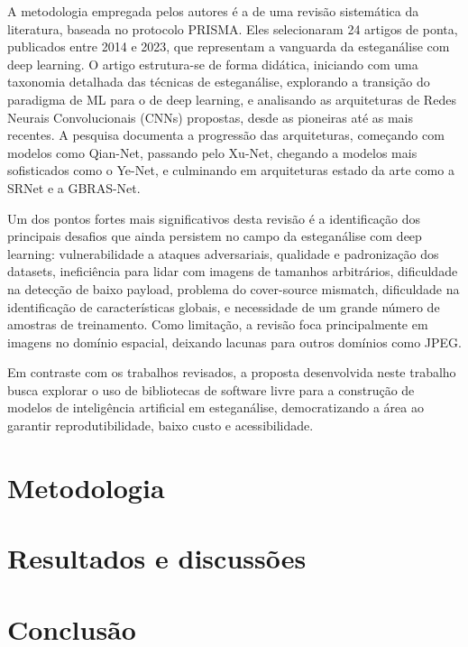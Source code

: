 \documentclass[12pt]{article}
\begin{document}
A metodologia empregada pelos autores é a de uma revisão sistemática da
literatura, baseada no protocolo PRISMA. Eles selecionaram 24 artigos de ponta,
publicados entre 2014 e 2023, que representam a vanguarda da esteganálise com
deep learning. O artigo estrutura-se de forma didática, iniciando com uma
taxonomia detalhada das técnicas de esteganálise, explorando a transição do
paradigma de ML para o de deep learning, e analisando as arquiteturas de Redes
Neurais Convolucionais (CNNs) propostas, desde as pioneiras até as mais
recentes. A pesquisa documenta a progressão das arquiteturas, começando com
modelos como Qian-Net, passando pelo Xu-Net, chegando a modelos mais
sofisticados como o Ye-Net, e culminando em arquiteturas estado da arte como a
SRNet e a GBRAS-Net.

Um dos pontos fortes mais significativos desta revisão é a identificação dos
principais desafios que ainda persistem no campo da esteganálise com deep
learning: vulnerabilidade a ataques adversariais, qualidade e padronização dos
datasets, ineficiência para lidar com imagens de tamanhos arbitrários,
dificuldade na detecção de baixo payload, problema do cover-source mismatch,
dificuldade na identificação de características globais, e necessidade de um
grande número de amostras de treinamento. Como limitação, a revisão foca
principalmente em imagens no domínio espacial, deixando lacunas para outros
domínios como JPEG.


Em contraste com os trabalhos revisados, a proposta desenvolvida neste trabalho
busca explorar o uso de bibliotecas de software livre para a construção de
modelos de inteligência artificial em esteganálise, democratizando a área ao
garantir reprodutibilidade, baixo custo e acessibilidade.

\section{Metodologia}

\section{Resultados e discussões}

\section{Conclusão}\label{sec:figs}
\end{document}
